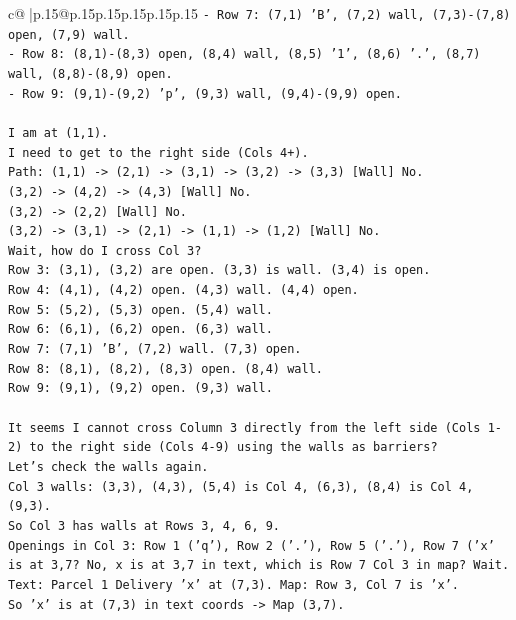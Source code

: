 \documentclass{article}
\begin{document}
{\begin{supertabular}{c@{$\;$}|p{.15\linewidth}@{}p{.15\linewidth}p{.15\linewidth}p{.15\linewidth}p{.15\linewidth}p{.15\linewidth}}
{{{\texttt{{-} Row 7: (7,1) 'B', (7,2) wall, (7,3){-}(7,8) open, (7,9) wall.} \\
\texttt{{-} Row 8: (8,1){-}(8,3) open, (8,4) wall, (8,5) '1', (8,6) '.', (8,7) wall, (8,8){-}(8,9) open.} \\
\texttt{{-} Row 9: (9,1){-}(9,2) 'p', (9,3) wall, (9,4){-}(9,9) open.} \\
\\ 
\texttt{I am at (1,1).} \\
\texttt{I need to get to the right side (Cols 4+).} \\
\texttt{Path: (1,1) {-}> (2,1) {-}> (3,1) {-}> (3,2) {-}> (3,3) {[}Wall{]} No.} \\
\texttt{(3,2) {-}> (4,2) {-}> (4,3) {[}Wall{]} No.} \\
\texttt{(3,2) {-}> (2,2) {[}Wall{]} No.} \\
\texttt{(3,2) {-}> (3,1) {-}> (2,1) {-}> (1,1) {-}> (1,2) {[}Wall{]} No.} \\
\texttt{Wait, how do I cross Col 3?} \\
\texttt{Row 3: (3,1), (3,2) are open. (3,3) is wall. (3,4) is open.} \\
\texttt{Row 4: (4,1), (4,2) open. (4,3) wall. (4,4) open.} \\
\texttt{Row 5: (5,2), (5,3) open. (5,4) wall.} \\
\texttt{Row 6: (6,1), (6,2) open. (6,3) wall.} \\
\texttt{Row 7: (7,1) 'B', (7,2) wall. (7,3) open.} \\
\texttt{Row 8: (8,1), (8,2), (8,3) open. (8,4) wall.} \\
\texttt{Row 9: (9,1), (9,2) open. (9,3) wall.} \\
\\ 
\texttt{It seems I cannot cross Column 3 directly from the left side (Cols 1{-}2) to the right side (Cols 4{-}9) using the walls as barriers?} \\
\texttt{Let's check the walls again.} \\
\texttt{Col 3 walls: (3,3), (4,3), (5,4) is Col 4, (6,3), (8,4) is Col 4, (9,3).} \\
\texttt{So Col 3 has walls at Rows 3, 4, 6, 9.} \\
\texttt{Openings in Col 3: Row 1 ('q'), Row 2 ('.'), Row 5 ('.'), Row 7 ('x' is at 3,7? No, x is at 3,7 in text, which is Row 7 Col 3 in map? Wait.} \\
\texttt{Text: Parcel 1 Delivery 'x' at (7,3). Map: Row 3, Col 7 is 'x'.} \\
\texttt{So 'x' is at (7,3) in text coords {-}> Map (3,7).} \\
}}}
\end{supertabular}}
\end{document}
